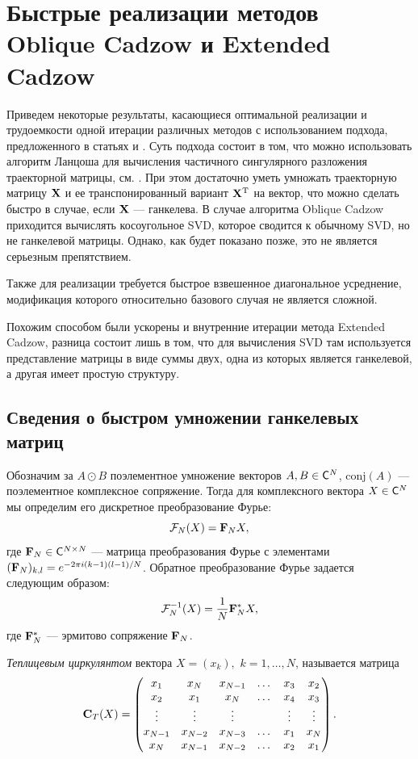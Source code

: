 \documentclass[12pt, specialist, subf,href,colorlinks=true,substylefile = spbu.rtx]{disser}
\theoremstyle{remark}
\theoremstyle{definition}
\begin{document}
\chapter{Быстрые реализации методов Oblique Cadzow и Extended Cadzow}
\label{sec:fast}
Приведем некоторые результаты, касающиеся оптимальной реализации и трудоемкости одной итерации различных методов с использованием подхода, предложенного в статьях \cite{Korobeynikov2010} и \cite{Golyandina2013a}. Суть подхода состоит в том, что можно использовать алгоритм Ланцоша для вычисления частичного сингулярного разложения траекторной матрицы, см. \cite{Korobeynikov2010}. При этом достаточно уметь умножать траекторную матрицу $\mathbf{X}$ и ее транспонированный вариант $\mathbf{X}^{\mathrm{T}}$ на вектор, что можно сделать быстро в случае, если $\mathbf{X}$ --- ганкелева. В случае алгоритма Oblique Cadzow приходится вычислять косоугольное SVD, которое сводится к обычному SVD, но не ганкелевой матрицы. Однако, как будет показано позже, это не является серьезным препятствием.

Также для реализации требуется быстрое взвешенное диагональное усреднение, модификация которого относительно базового случая не является сложной.

Похожим способом были ускорены и внутренние итерации метода Extended Cadzow, разница состоит лишь в том, что для вычисления SVD там используется представление матрицы в виде суммы двух, одна из которых является ганкелевой, а другая имеет простую структуру.

\section{Сведения о быстром умножении ганкелевых матриц}
Обозначим за $A \odot B$ поэлементное умножение векторов $A, B \in \mathsf{C}^N$, $\text{conj}(A)$ --- поэлементное комплексное сопряжение. Тогда для комплексного вектора $X \in \mathsf{C}^N$ мы определим его дискретное преобразование Фурье:
\begin{equation}\label{Fourier_transform}
\mathcal{F}_N(X) = \mathbf{F}_N X,
\end{equation}
где $\mathbf{F}_N \in \mathsf{C}^{N \times N}$ --- матрица преобразования Фурье с элементами $(\mathbf{F}_N)_{k,l} = e^{-2 \pi i(k-1)(l-1)/N}$. Обратное преобразование Фурье задается следующим образом:
\begin{equation*}
\mathcal{F}^{-1}_N(X) = \frac{1}{N}\mathbf{F}^*_N X,
\end{equation*}
где $\mathbf{F}^*_N$ --- эрмитово сопряжение $\mathbf{F}_N$.

\emph{Теплицевым циркулянтом} вектора $X=(x_k),$ $k = 1, \ldots, N$, называется матрица
\begin{equation*}
\mathbf{C}_T(X) = \begin{pmatrix}
x_1 & x_N & x_{N-1} & \dots & x_3 & x_2 \\ 
x_2 & x_1 & x_N & \dots & x_4 & x_3 \\ 
\vdots & \vdots & \vdots &  & \vdots & \vdots \\ 
x_{N-1} & x_{N-2} & x_{N-3} & \dots & x_1 & x_N \\ 
x_N & x_{N-1} & x_{N-2} & \dots & x_2 & x_1
\end{pmatrix}.
\end{equation*}
\end{document}
